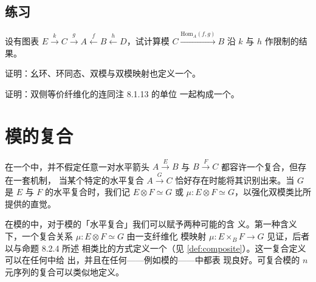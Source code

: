 \providecommand{\Mod}{\mathbb{M}od}
\providecommand{\Fun}{\operatorname{Fun}}
\providecommand{\HomA}{\mathrm{Hom}_{A}}
\providecommand{\HomB}{\mathrm{Hom}_{B}}
\providecommand{\HomC}{\mathrm{Hom}_{C}}
\providecommand{\Homf}{\mathrm{Hom}_{f}}
\providecommand{\Homg}{\mathrm{Hom}_{g}}

\subsection*{练习}

\begin{exercise}\label{ex:restriction-hom-along-functors}
设有\trFunctor{}图表
$E\xrightarrow{k}C\xrightarrow{g}A\xleftarrow{f}B\xleftarrow{h}D$，试计算模
$C\xrightarrow{\HomA(f,g)}B$ 沿\trFunctor{} $k$ 与 $h$ 作限制的结果。
\end{exercise}

\begin{exercise}\label{ex:unital-rings-bimodules-equipment}
证明：幺环、环同态、双模与双模映射也定义一个\trVirtualEquipment。
\end{exercise}

\begin{exercise}\label{ex:two-sided-isofibrations-virtual-equipment}
证明：双侧等价纤维化的\trVirtualDoubleCategory{}连同注 8.1.13 的单位%
\trCell{}一起构成一个\trVirtualEquipment。
\end{exercise}

\section{模的复合}\label{sec:composition-of-modules}

在一个\trVirtualEquipment{}中，并不假定任意一对水平箭头
$A\xrightarrow{E}B$ 与 $B\xrightarrow{F}C$ 都容许一个复合，但存在一套机制，
当某个特定的水平复合 $A\xrightarrow{G}C$ 恰好存在时能将其识别出来。当 $G$ 是
$E$ 与 $F$ 的水平复合时，我们记 $E\otimes F\simeq G$ 或
$\mu\colon E\otimes F\simeq G$，以强化双模类比所提供的直觉。

在模的\trVirtualEquipment{}中，对于模的「水平复合」我们可以赋予两种可能的含
义。第一种含义下，一个复合关系 $\mu\colon E\otimes F\simeq G$ 由一支纤维化
模映射 $\mu\colon E\times_{B}F\xrightarrow{}G$ 见证，后者以与命题 8.2.4 所述%
\trUniversalProperty{}相类比的方式定义一个\trCocartesian\trCell{}（见%
\cref{def:composite}）。这一复合定义可以在任何\trVirtualDoubleCategory{}中给
出，并且在任何\trVirtualEquipment{}——例如模的\trVirtualEquipment——中都表
现良好。可复合模的 $n$ 元序列的复合可以类似地定义。

